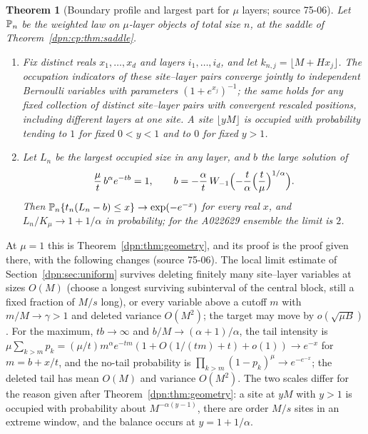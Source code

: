 \documentclass[11pt]{article}
\numberwithin{equation}{section}
\newtheorem{theorem}{Theorem}[section]
\theoremstyle{definition}\newtheorem{definition}[theorem]{Definition}
\theoremstyle{remark}\newtheorem{remark}[theorem]{Remark}
\newcommand{\src}[1]{\textup{(source #1)}}
\begin{document}
\begin{theorem}[Boundary profile and largest part for $\mu$ layers; source 75-06]\label{dpn:cp:thm:geometry}
Let $\mathbb P_n$ be the weighted law on $\mu$-layer objects of total size $n$, at
the saddle of Theorem~\ref{dpn:cp:thm:saddle}.
\begin{enumerate}
\item Fix distinct reals $x_1,\dots,x_d$ and layers $i_1,\dots,i_d$, and let
  $k_{n,j}=\lfloor M+Hx_j\rfloor$.  The occupation indicators of these
  site--layer pairs converge jointly to independent Bernoulli variables with
  parameters $(1+e^{x_j})^{-1}$; the same holds for any fixed collection of
  distinct site--layer pairs with convergent rescaled positions, including
  different layers at one site.  A site $\lfloor yM\rfloor$ is occupied with
  probability tending to $1$ for fixed $0<y<1$ and to $0$ for fixed $y>1$.
\item Let $L_n$ be the largest occupied size in any layer, and $b$ the large
  solution of
  \begin{equation}\label{dpn:cp:eq:bcenter}
   \frac{\mu}{t}\,b^\alpha e^{-tb}=1,\qquad
   b=-\frac\alpha t\,W_{-1}\Bigl(-\frac t\alpha\Bigl(\frac t\mu\Bigr)^{1/\alpha}\Bigr).
  \end{equation}
  Then $\mathbb P_n\{t_n(L_n-b)\le x\}\to\exp(-e^{-x})$ for every real $x$, and
  $L_n/K_\mu\to1+1/\alpha$ in probability; for the A022629 ensemble the limit
  is $2$.
\end{enumerate}
\end{theorem}
At $\mu=1$ this is Theorem~\ref{dpn:thm:geometry}, and its proof is the proof
given there, with the following changes \src{75-06}.  The local limit estimate
of Section~\ref{dpn:sec:uniform} survives deleting finitely many site--layer
variables at sizes $O(M)$ (choose a longest surviving subinterval of the
central block, still a fixed fraction of $M/s$ long), or every variable above
a cutoff $m$ with $m/M\to\gamma>1$ and deleted variance $O(M^2)$; the target
may move by $o(\sqrt{\mu B})$.  For the maximum, $tb\to\infty$ and
$b/M\to(\alpha+1)/\alpha$, the tail intensity is
$\mu\sum_{k>m}p_k=(\mu/t)m^\alpha e^{-tm}(1+O(1/(tm)+t)+o(1))\to e^{-x}$ for
$m=b+x/t$, and the no-tail probability is $\prod_{k>m}(1-p_k)^\mu\to
e^{-e^{-x}}$; the deleted tail has mean $O(M)$ and variance $O(M^2)$.  The two
scales differ for the reason given after Theorem~\ref{dpn:thm:geometry}: a site
at $yM$ with $y>1$ is occupied with probability about $M^{-\alpha(y-1)}$, there
are order $M/s$ sites in an extreme window, and the balance occurs at
$y=1+1/\alpha$.
\end{document}
